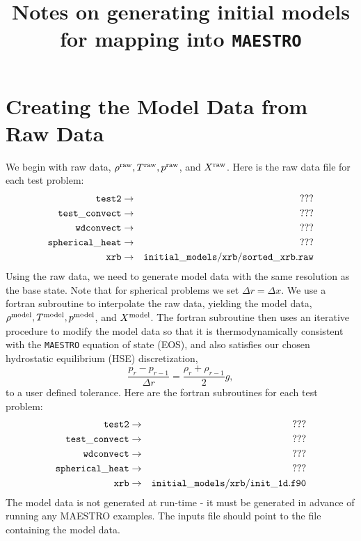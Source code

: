 \documentclass[11pt]{article}
\title{Notes on generating initial models for mapping into {\tt MAESTRO}}
\def\model {\rm model}
\def\raw   {\rm raw}
\begin{document}
\maketitle
\tableofcontents

\clearpage

\section{Creating the Model Data from Raw Data}\label{Sec:Creating the Model Data from Raw Data}
We begin with raw data, $\rho^{\raw}, T^{\raw}, p^{\raw}$, and $X^{\raw}$.  Here is the raw data file for each test problem:
\begin{eqnarray}
{\tt test2} & \rightarrow & {\tt ???} \nonumber \\
{\tt test\_convect} & \rightarrow & {\tt ???} \nonumber \\
{\tt wdconvect} & \rightarrow & {\tt ???} \nonumber \\
{\tt spherical\_heat} & \rightarrow & {\tt ???} \nonumber \\
{\tt xrb} & \rightarrow & {\tt initial\_models/xrb/sorted\_xrb.raw} \nonumber
\end{eqnarray}
Using the raw data, we need to generate model data with the same resolution as the base state.  Note that for spherical problems we set $\Delta r = \Delta x$.  We use a fortran subroutine to interpolate the raw data, yielding the model data, $\rho^{\model}, T^{\model}, p^{\model}$, and $X^{\model}$.  The fortran subroutine then uses an iterative procedure to modify the model data so that it is thermodynamically consistent with the {\tt MAESTRO} equation of state (EOS), and also satisfies our chosen hydrostatic equilibrium (HSE) discretization,
\begin{equation}
\frac{p_r - p_{r-1}}{\Delta r} = \frac{\rho_r + \rho_{r-1}}{2}g,\label{HSE Discretization}
\end{equation}
to a user defined tolerance.  Here are the fortran subroutines for each test problem:
\begin{eqnarray}
{\tt test2} & \rightarrow & {\tt ???} \nonumber \\
{\tt test\_convect} & \rightarrow & {\tt ???} \nonumber \\
{\tt wdconvect} & \rightarrow & {\tt ???} \nonumber \\
{\tt spherical\_heat} & \rightarrow & {\tt ???} \nonumber \\
{\tt xrb} & \rightarrow & {\tt initial\_models/xrb/init\_1d.f90} \nonumber
\end{eqnarray}
The model data is not generated at run-time - it must be generated in advance of running any MAESTRO examples.  The inputs file should point to the file containing the model data.
\end{document}
